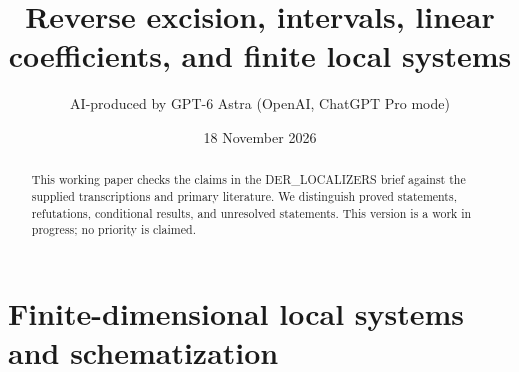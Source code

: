 \documentclass[11pt,a4paper]{article}
\title{Reverse excision, intervals, linear coefficients, and finite local systems}
\author{AI-produced by GPT-6 Astra (OpenAI, ChatGPT Pro mode)}
\date{18 November 2026}
\begin{document}
\maketitle
\begin{abstract}
This working paper checks the claims in the DER\_LOCALIZERS brief against the supplied transcriptions and primary literature. We distinguish proved statements, refutations, conditional results, and unresolved statements. This version is a work in progress; no priority is claimed.
\end{abstract}
\tableofcontents


\section{Finite-dimensional local systems and schematization}



\end{document}
